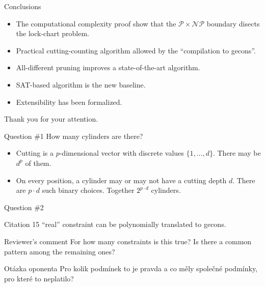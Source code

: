 \begin{frame}{Conclusions}
  \begin{itemize}
    \item The computational complexity proof show that the
    $\mathcal{P} \times \mathcal{NP}$ boundary disects the lock-chart problem.
    \item Practical cutting-counting algorithm allowed by the “compilation to gecons”.
    \item All-different pruning improves a state-of-the-art algorithm.
    \item SAT-based algorithm is the new baseline.
    \item Extensibility has been formalized.
  \end{itemize}
\end{frame}

\begin{frame}
  \begin{center}
    Thank you for your attention.
  \end{center}
\end{frame}



\begin{frame}{Question \#1}
  How many cylinders are there?

  \vfill

  \begin{itemize}
    \item Cutting is a $p$-dimensional vector
    with discrete values $\{1, \ldots, d\}$.
    There may be $d^p$ of them.
    \item On every position, a cylinder may or may not have a cutting depth $d$.
    There are $p\cdot d$ such binary choices. Together $2^{p\cdot d}$ cylinders.
  \end{itemize}
\end{frame}

\begin{frame}{Question \#2}
  \begin{block}{Citation}
    15 “real” constraint can be polynomially translated to gecons.  
  \end{block}

  \vfill

  \begin{block}{Reviewer's comment}
    For how many constraints is this true?
    Is there a common pattern among the remaining ones?
  \end{block}
  
  \vfill

  \begin{block}{Otázka oponenta}
    Pro kolik podmínek to je pravda
    a co měly společné podmínky,
    pro které to neplatilo?
  \end{block}

  \vfill
\end{frame}


